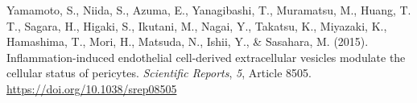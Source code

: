 \documentclass[authordate, empirical, issue]{jote-new-article}
\begin{document}
	Yamamoto, S., Niida, S., Azuma, E., Yanagibashi, T., Muramatsu, M., Huang, T. T., Sagara, H., Higaki, S., Ikutani, M., Nagai, Y., Takatsu, K., Miyazaki, K., Hamashima, T., Mori, H., Matsuda, N., Ishii, Y., \& Sasahara, M. (2015). Inflammation-induced endothelial cell-derived extracellular vesicles modulate the cellular status of pericytes. \emph{Scientific Reports},\emph{ 5}, Article 8505. \url{https://doi.org/10.1038/srep08505}
\end{document}

